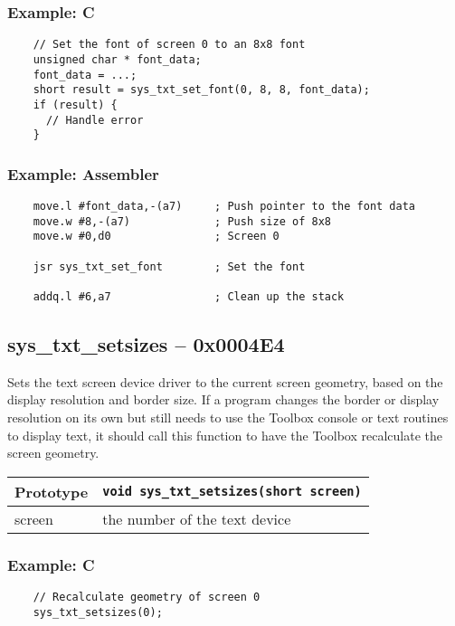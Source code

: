 \subsubsection*{Example: C}
\begin{lstlisting}
    // Set the font of screen 0 to an 8x8 font
    unsigned char * font_data;
    font_data = ...;
    short result = sys_txt_set_font(0, 8, 8, font_data);
    if (result) {
      // Handle error
    }    
\end{lstlisting}

\subsubsection*{Example: Assembler}
\begin{verbatim}
    move.l #font_data,-(a7)     ; Push pointer to the font data
    move.w #8,-(a7)             ; Push size of 8x8
    move.w #0,d0                ; Screen 0

    jsr sys_txt_set_font        ; Set the font

    addq.l #6,a7                ; Clean up the stack
\end{verbatim}


\subsection*{sys\_txt\_setsizes -- 0x0004E4}
Sets the text screen device driver to the current screen geometry, based on the display resolution and border size.
If a program changes the border or display resolution on its own but still needs to use the Toolbox console or text routines to display text,
it should call this function to have the Toolbox recalculate the screen geometry.

\bigskip

\begin{tabular}{|l||l|} \hline
Prototype & \lstinline!void sys_txt_setsizes(short screen)! \\ \hline
screen & the number of the text device \\ \hline
\end{tabular}

\subsubsection*{Example: C}
\begin{lstlisting}
    // Recalculate geometry of screen 0
    sys_txt_setsizes(0);
\end{lstlisting}

